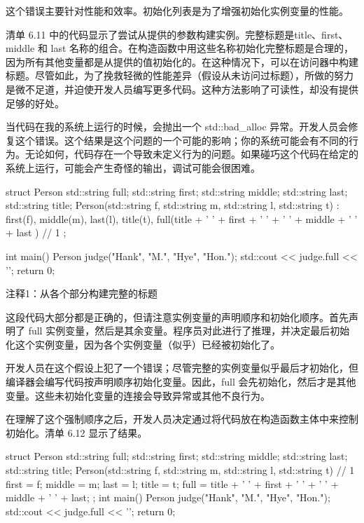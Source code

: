 这个错误主要针对性能和效率。初始化列表是为了增强初始化实例变量的性能。


清单 6.11 中的代码显示了尝试从提供的参数构建实例。完整标题是title、first、middle 和 last 名称的组合。在构造函数中用这些名称初始化完整标题是合理的，因为所有其他变量都是从提供的值初始化的。在这种情况下，可以在访问器中构建标题。尽管如此，为了挽救轻微的性能差异（假设从未访问过标题），所做的努力是微不足道，并迫使开发人员编写更多代码。这种方法影响了可读性，却没有提供足够的好处。

当代码在我的系统上运行的时候，会抛出一个 std::bad\_alloc 异常。开发人员会修复这个错误。这个结果是这个问题的一个可能的影响；你的系统可能会有不同的行为。无论如何，代码存在一个导致未定义行为的问题。如果碰巧这个代码在给定的系统上运行，可能会产生奇怪的输出，调试可能会很困难。


\begin{cpp}
struct Person {
  std::string full;
  std::string first;
  std::string middle;
  std::string last;
  std::string title;
  Person(std::string f, std::string m, std::string l, std::string t) :
    first(f), middle(m), last(l), title(t),
    full(title + ' ' + first + ' ' + ' ' + middle + ' ' + last ) {} // 1
};

int main() {
  Person judge("Hank", "M.", "Hye", "Hon.");
  std::cout << judge.full << '\n';
  return 0;
}
\end{cpp}

{\footnotesize
注释1：从各个部分构建完整的标题
}


这段代码大部分都是正确的，但请注意实例变量的声明顺序和初始化顺序。首先声明了 full 实例变量，然后是其余变量。程序员对此进行了推理，并决定最后初始化这个实例变量，因为各个实例变量（似乎）已经被初始化了。

开发人员在这个假设上犯了一个错误；尽管完整的实例变量似乎最后才初始化，但编译器会编写代码按声明顺序初始化变量。因此，full 会先初始化，然后才是其他变量。这些未初始化变量的连接会导致异常或其他不良行为。

在理解了这个强制顺序之后，开发人员决定通过将代码放在构造函数主体中来控制初始化。清单 6.12 显示了结果。


\begin{cpp}
struct Person {
  std::string full;
  std::string first;
  std::string middle;
  std::string last;
  std::string title;
  Person(std::string f, std::string m, std::string l, std::string t) { // 1
    first = f; middle = m; last = l; title = t;
    full = title + ' ' + first + ' ' + ' ' + middle + ' ' + last;
  }
};
int main() {
  Person judge("Hank", "M.", "Hye", "Hon.");
  std::cout << judge.full << '\n';
  return 0;
}
\end{cpp}

